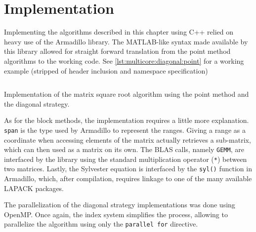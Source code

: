 \documentclass[../thesis]{subfiles}
\begin{document}
	\section{Implementation}
	Implementing the algorithms described in this chapter using C++ relied on heavy use of the Armadillo library. The MATLAB-like syntax made available by this library allowed for straight forward translation from the point method algorithms to the working code. See \cref{lst:multicore:diagonal:point} for a working example (stripped of header inclusion and namespace specification)

	\begin{listing}
		\inputminted[linenos,tabsize=4]{c++}{assets/code/multicore.diagonal.point.cpp}
		\caption[(Multicore) Point Diagonal Implementation]{Implementation of the matrix square root algorithm using the point method and the diagonal strategy.}
		\label{lst:multicore:diagonal:point}
	\end{listing}

	As for the block methods, the implementation requires a little more explanation. \texttt{span} is the type used by Armadillo to represent the ranges. Giving a range as a coordinate when accessing elements of the matrix actually retrieves a sub-matrix, which can then used as a matrix on its own. The BLAS calls, namely \texttt{GEMM}, are interfaced by the library using the standard multiplication operator (\texttt{*}) between two matrices. Lastly, the Sylvester equation is interfaced by the \texttt{syl()} function in Armadillo, which, after compilation, requires linkage to one of the many available LAPACK packages.

	The parallelization of the diagonal strategy implementations was done using OpenMP. Once again, the index system simplifies the process, allowing to parallelize the algorithm using only the \texttt{parallel for} directive.
\end{document}
